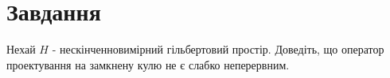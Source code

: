 
\chapter{Завдання \theHchapter}

\begin{tcolorbox}[title=Завдання]
    Нехай $H$ - нескінченновимірний гільбертовий простір. 
    Доведіть, що оператор проектування на замкнену кулю 
    не є слабко неперервним.
\end{tcolorbox}



